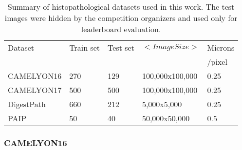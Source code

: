 \documentclass[times,twocolumn,final,authoryear]{tmp}
\begin{document}
\begin{table}
\centering
\caption{Summary of histopathological datasets used in this work. The test images were hidden by the competition organizers and used only for leaderboard evaluation.}
\label{path_tab:datasets}
\setlength{\tabcolsep}{3pt}
\begin{tabular}{@{}lllll@{}}
  
Dataset     & Train set     & Test set  & $<Image Size>$ &  Microns  \\
            &               &           &                &  /pixel    \\    
CAMELYON16                                    & 270                        & 129                       & 100,000x100,000                     & 0.25                                                                                       \\
CAMELYON17                                    & 500                        & 500                       & 100,000x100,000                     & 0.25                                                                                      \\
DigestPath                                    & 660                        & 212                       & 5,000x5,000                         & 0.25                                                                                       \\
PAIP                                          & 50                         & 40                        & 50,000x50,000                       & 0.5                                                                                        \\  
\end{tabular}
\end{table}





\subsubsection{CAMELYON16}
\end{document}
